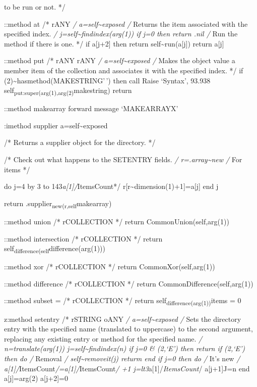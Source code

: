 to be run or not. */

::method at /* rANY \emph{/ a=self\textasciitilde exposed /} Returns the
item associated with the specified index. \emph{/
j=self\textasciitilde findindex(arg(1)) if j=0 then return .nil /} Run
the method if there is one. */ if a{[}j+2{]} then return
self\textasciitilde run(a{[}j{]}) return a{[}j{]}

::method put /* rANY rANY \emph{/ a=self\textasciitilde exposed /} Makes
the object value a member item of the collection and associates it with
the specified index. */ if
\arg(2)\textasciitilde hasmethod(MAKESTRING'\,') then call Raise
`Syntax', 93.938 self\textsubscript{put:super(arg(1),arg(2)}makestring)
return

::method makearray forward message `MAKEARRAYX'

:imethod supplier a=self\textasciitilde exposed

/* Returns a supplier object for the directory. */

/* Check out what happens to the SETENTRY fields. \emph{/
r=.array\textasciitilde new /} For items */

do j=4 by 3 to 143\emph{a{[}1{]}/}ItemsCount*/
r{[}r\textasciitilde dimension(1)+1{]}=a{[}j{]} end j

return .supplier\textsubscript{new(r,self}makearray)

::method union /* rCOLLECTION */ return CommonUnion(self,arg(1))

::method intersection /* rCOLLECTION */ return
self\textsubscript{difference(self}difference(arg(1)))

::method xor /* rCOLLECTION */ return CommonXor(self,arg(1))

::method difference /* rCOLLECTION */ return
CommonDifference(self,arg(1))

::method subset = /* rCOLLECTION */ return
self\textsubscript{difference(arg(1))}items = 0

z:method setentry /* rSTRING oANY \emph{/ a=self\textasciitilde exposed
/} Sets the directory entry with the specified name (translated to
uppercase) to the second argument, replacing any existing entry or
method for the specified name. \emph{/ n=translate(arg(1))
j=self\textasciitilde findindex(n) if j=0 \& \arg(2,`E') then return if
\arg(2,`E') then do /} Removal \emph{/ self\textasciitilde removeit(j)
returm end if j=0 then do /} It's new \emph{/
a{[}1{]}/}ItemsCount\emph{/=a{[}1{]}/}ItemsCount\emph{/ +1
j=lt3}a{[}1{]}/\emph{ItemsCount}/ a{[}j+1{]}J=n end a{[}j{]}=arg(2)
a{[}j+2{]}=0


